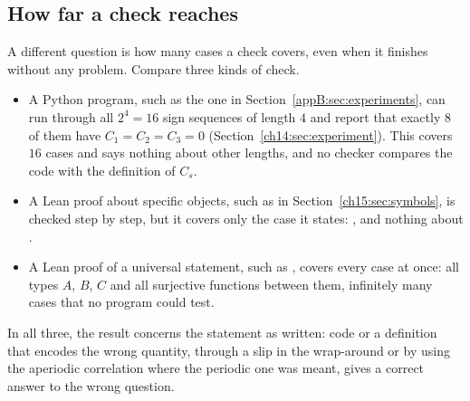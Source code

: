 \subsection*{How far a check reaches}
A different question is how many cases a check covers, even when it finishes without any problem. Compare three kinds of check.
\begin{itemize}
\item A Python program, such as the one in Section~\ref{appB:sec:experiments}, can run through all $2^4=16$ sign sequences of length $4$ and report that exactly $8$ of them have $C_1=C_2=C_3=0$ (Section~\ref{ch14:sec:experiment}). This covers $16$ cases and says nothing about other lengths, and no checker compares the code with the definition of $C_s$.
\item A Lean proof about specific objects, such as  in Section~\ref{ch15:sec:symbols}, is checked step by step, but it covers only the case it states: , and nothing about .
\item A Lean proof of a universal statement, such as , covers every case at once: all types $A$, $B$, $C$ and all surjective functions between them, infinitely many cases that no program could test.
\end{itemize}
In all three, the result concerns the statement as written: code or a definition that encodes the wrong quantity, through a slip in the wrap-around or by using the aperiodic correlation where the periodic one was meant, gives a correct answer to the wrong question.
